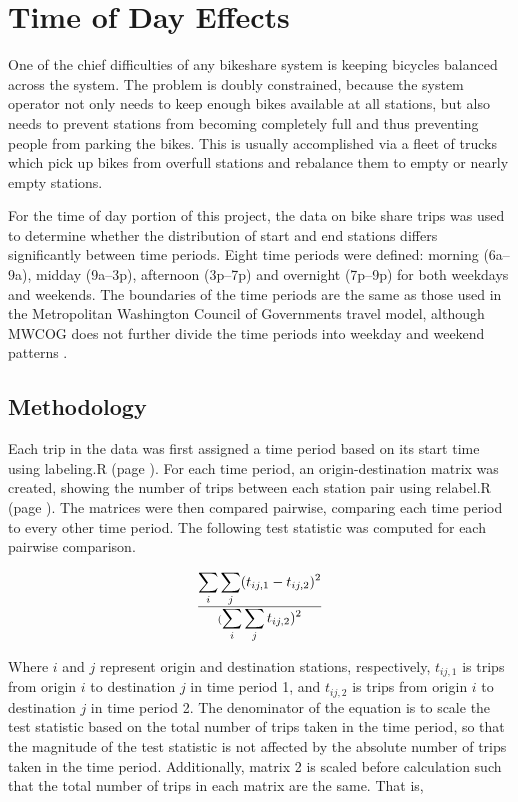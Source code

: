 \documentclass[letterpaper,11pt]{article}
\newcommand{\reflst}[1]{#1 (page \pageref{#1})}
\begin{document}
\section{Time of Day Effects}

One of the chief difficulties of any bikeshare system is keeping
bicycles balanced across the system. The problem is doubly
constrained, because the system operator not only needs to keep enough
bikes available at all stations, but also needs to prevent stations
from becoming completely full and thus preventing people from parking
the bikes. This is usually accomplished via a fleet of trucks which
pick up bikes from overfull stations and rebalance them to empty or
nearly empty stations.

For the time of day portion of this project, the data on bike share
trips was used to determine whether the distribution of start and end
stations differs significantly between time periods. Eight time
periods were defined: morning (6a--9a), midday (9a--3p), afternoon
(3p--7p) and overnight (7p--9p) for both weekdays and weekends. The
boundaries of the time periods are the same as those used in the
Metropolitan Washington Council of Governments travel model, although
MWCOG does not further divide the time periods into weekday and
weekend patterns \autocite[14]{MWCOG2013}.

\subsection{Methodology}

Each trip in the data was first assigned a time period based on its
start time using \reflst{labeling.R}. For each time period, an
origin-destination matrix was created, showing the number of trips
between each station pair using \reflst{relabel.R}. The matrices were
then compared pairwise, comparing each time period to every other time
period. The following test statistic was computed for each pairwise
comparison.

\begin{equation}\label{eq:timets}
 \displaystyle\sum_i \sum_j (t_{ij,1} - t_{ij,2})^2 \over
 (\displaystyle \sum_i \sum_j t_{ij,2})^2
\end{equation}

Where $i$ and $j$ represent origin and destination stations,
respectively, $t_{ij,1}$ is trips from origin $i$ to destination $j$
in time period 1, and $t_{ij,2}$ is trips from origin $i$ to
destination $j$ in time period 2. The denominator of the equation is
to scale the test statistic based on the total number of trips taken
in the time period, so that the magnitude of the test statistic is not
affected by the absolute number of trips taken in the time
period. Additionally, matrix 2 is scaled before calculation such
that the total number of trips in each matrix are the same. That is,
\end{document}
